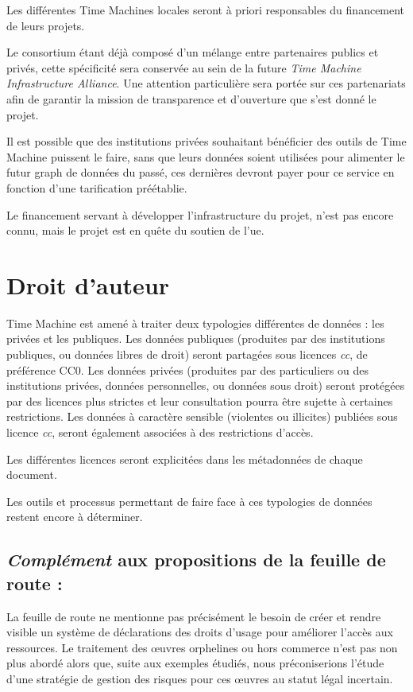 Les différentes Time Machines locales seront à priori responsables du financement de leurs projets. 

Le consortium étant déjà composé d'un mélange entre partenaires publics et privés, cette spécificité sera conservée au sein de la future \textit{Time Machine Infrastructure Alliance}. Une attention particulière sera portée sur ces partenariats afin de garantir la mission de transparence et d'ouverture que s'est donné le projet. 

Il est possible que des institutions privées souhaitant bénéficier des outils de Time Machine puissent le faire, sans que leurs données soient utilisées pour alimenter le futur \gls{graph} de données du passé, ces dernières devront payer pour ce service en fonction d'une tarification préétablie.

Le financement servant à développer l'infrastructure du projet, n'est pas encore connu, mais le projet est en quête du soutien de l'\gls{ue}.


\section {Droit d'auteur}

Time Machine est amené à traiter deux typologies différentes de données : les privées et les publiques. Les données publiques (produites par des institutions publiques, ou données libres de droit) seront partagées sous licences \textit{\gls{cc}}, de préférence CC0. Les données privées (produites par des particuliers ou des institutions privées, données personnelles, ou données sous droit) seront protégées par des licences plus strictes et leur consultation pourra être sujette à certaines restrictions. Les données à caractère sensible (violentes ou illicites) publiées sous licence \textit{\gls{cc}}, seront également associées à des restrictions d'accès. 

Les différentes licences seront explicitées dans les métadonnées de chaque document. 

Les outils et processus permettant de faire face à ces typologies de données restent encore à déterminer.

\subsection{\textit{Complément} aux propositions de la feuille de route :}

La feuille de route ne mentionne pas précisément le besoin de créer et rendre visible un système de déclarations des droits d'usage pour améliorer l'accès aux ressources. Le traitement des \oe{}uvres orphelines ou hors commerce n'est pas non plus abordé alors que, suite aux exemples étudiés, nous préconiserions l'étude d'une stratégie de gestion des risques pour ces \oe{}uvres au statut légal incertain.

